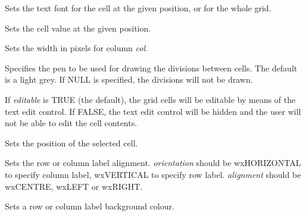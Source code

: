 
Sets the text font for the cell at the given position, or for the whole grid.



Sets the cell value at the given position.



Sets the width in pixels for column {\it col}.



Specifies the pen to be used for drawing the divisions between cells. The default
is a light grey. If NULL is specified, the divisions will not be drawn.



If {\it editable} is TRUE (the default), the grid cells will be editable by means of the
text edit control. If FALSE, the text edit control will be hidden and the user will not
be able to edit the cell contents.



Sets the position of the selected cell.



Sets the row or column label alignment. {\it orientation} should
be wxHORIZONTAL to specify column label, wxVERTICAL to specify row label.\rtfsp
{\it alignment} should be wxCENTRE, wxLEFT or wxRIGHT.



Sets a row or column label background colour.


